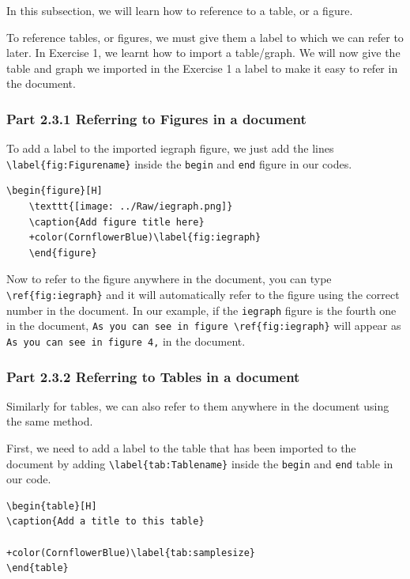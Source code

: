 \documentclass[12pts]{report}
\begin{document}
In this subsection, we will learn how to reference to a table, or a figure. 

To reference tables, or figures, we must give them a label to which we can refer to later. In Exercise 1, we learnt how to import a table/graph. We will now give the table and graph we imported in the Exercise 1 a label to make it easy to refer in the document. 

\subsubsection*{Part 2.3.1 Referring to Figures in a document}
To add a label to the imported iegraph figure, we just add the lines \verb|\label{fig:Figurename}| inside the \texttt{begin} and \texttt{end} figure in our codes. 

\begin{Verbatim}[commandchars=+\(\)]
	\begin{figure}[H]
	\texttt{[image: ../Raw/iegraph.png]}
	\caption{Add figure title here}
	+color(CornflowerBlue)\label{fig:iegraph}
	\end{figure}
\end{Verbatim}

Now to refer to the figure anywhere in the document, you can type \verb|\ref{fig:iegraph}| and it will automatically refer to the figure using the correct number in the document. In our example, if the \texttt{iegraph}	figure is the fourth one in the document, \verb|As you can see in figure \ref{fig:iegraph}| will appear as \texttt{As you can see in figure 4,} in the document. 

\subsubsection*{Part 2.3.2 Referring to Tables in a document}

Similarly for tables, we can also refer to them anywhere in the document using the same method.

First, we need to add a label to the table that has been imported to the document by adding \verb|\label{tab:Tablename}| inside the \texttt{begin} and \texttt{end} table in our code. 

\begin{Verbatim}[commandchars=+\(\)]
\begin{table}[H]
\caption{Add a title to this table}

+color(CornflowerBlue)\label{tab:samplesize}
\end{table}
\end{Verbatim}
\end{document}
